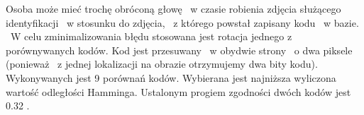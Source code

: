 Osoba może mieć trochę obróconą głowę ~w czasie robienia zdjęcia służącego identyfikacji ~w stosunku do zdjęcia, ~z którego powstał zapisany kodu ~w bazie. ~W celu zminimalizowania błędu stosowana jest rotacja jednego z porównywanych kodów. Kod jest przesuwany ~w obydwie strony ~o dwa piksele (ponieważ ~z jednej lokalizacji na obrazie otrzymujemy dwa bity kodu). Wykonywanych jest 9 porównań kodów. Wybierana jest najniższa wyliczona wartość odległości Hamminga. Ustalonym progiem zgodności dwóch kodów jest 0.32 \cite{Daugman}.
